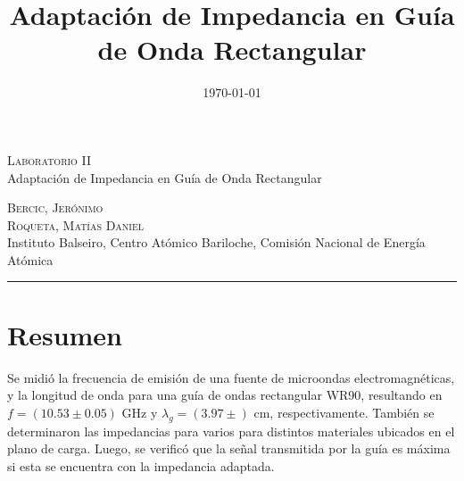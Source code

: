 \documentclass[11pt,a4paper]{article}
\date{\small{\today}}
\begin{document}
\title{Adaptación de Impedancia en Guía de Onda Rectangular}
	\LARGE{\textsc{Laboratorio II}}\\
	\Large{Adaptación de Impedancia en Guía de Onda Rectangular}\\
\begin{large}
\small\textsc{Bercic, Jerónimo}\\
\small\textsc{Roqueta, Matías Daniel}\\
\small{Instituto Balseiro, Centro Atómico Bariloche, Comisión Nacional de Energía Atómica}\\
\end{large}
\setcounter{page}{1}

\chead{}

\rfoot{\thepage} 
\renewcommand{\headrulewidth}{0.4pt} 
\renewcommand{\footrulewidth}{0.4pt} 
\pagestyle{fancy}

\hrule
\normalsize
\section{Resumen}
Se midió la frecuencia de emisión de una fuente de microondas electromagnéticas, y la longitud de onda para una guía de ondas rectangular WR90, resultando en $f=(10.53\pm0.05)$ GHz y $\lambda_g=(3.97\pm)$ cm, respectivamente. También se determinaron las impedancias para varios para distintos materiales ubicados en el plano de carga. Luego, se verificó que la señal transmitida por la guía es máxima si esta se encuentra con la impedancia adaptada. 
\end{document}
